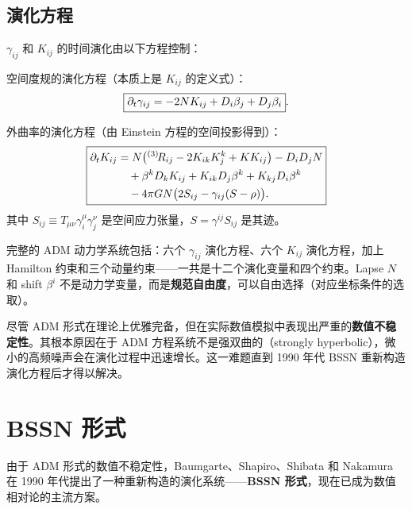 \subsection{演化方程}

$\gamma_{ij}$ 和 $K_{ij}$ 的时间演化由以下方程控制：

\begin{theorem}
空间度规的演化方程（本质上是 $K_{ij}$ 的定义式）：
\begin{equation}
    \boxed{\partial_t \gamma_{ij} = -2N K_{ij} + D_i\beta_j + D_j\beta_i}.
    \label{eq:ADM_evol_gamma}
\end{equation}

外曲率的演化方程（由 Einstein 方程的空间投影得到）：
\begin{equation}
    \boxed{\begin{aligned}
        \partial_t K_{ij} &= N\bigl({}^{(3)}\!R_{ij} - 2K_{ik}K^k_j + K K_{ij}\bigr) - D_i D_j N \\
        &\quad + \beta^k D_k K_{ij} + K_{ik}D_j\beta^k + K_{kj}D_i\beta^k \\
        &\quad - 4\pi G N\bigl(2S_{ij} - \gamma_{ij}(S - \rho)\bigr).
    \end{aligned}}
    \label{eq:ADM_evol_K}
\end{equation}
其中 $S_{ij} \equiv T_{\mu\nu}\gamma^\mu_i\gamma^\nu_j$ 是空间应力张量，$S = \gamma^{ij}S_{ij}$ 是其迹。
\label{thm:ADM_evolution}
\end{theorem}

完整的 ADM 动力学系统包括：六个 $\gamma_{ij}$ 演化方程、六个 $K_{ij}$ 演化方程，加上 Hamilton 约束和三个动量约束——一共是十二个演化变量和四个约束。Lapse $N$ 和 shift $\beta^i$ 不是动力学变量，而是\textbf{规范自由度}，可以自由选择（对应坐标条件的选取）。

\begin{note}
    尽管 ADM 形式在理论上优雅完备，但在实际数值模拟中表现出严重的\textbf{数值不稳定性}。其根本原因在于 ADM 方程系统不是强双曲的（strongly hyperbolic），微小的高频噪声会在演化过程中迅速增长。这一难题直到 1990 年代 BSSN 重新构造演化方程后才得以解决。
\end{note}

\section{BSSN 形式}
\label{sec:BSSN}

由于 ADM 形式的数值不稳定性，Baumgarte、Shapiro、Shibata 和 Nakamura 在 1990 年代提出了一种重新构造的演化系统——\textbf{BSSN 形式}，现在已成为数值相对论的主流方案。

